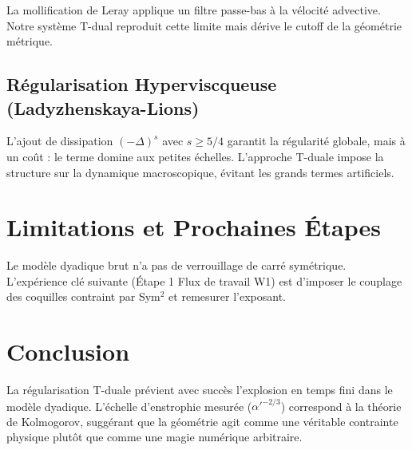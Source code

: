 \documentclass[11pt,a4paper]{article}
\begin{document}
La mollification de Leray applique un filtre passe-bas à la
vélocité advective. Notre système T-dual reproduit cette limite
mais dérive le cutoff de la géométrie métrique.

\subsection{Régularisation Hyperviscqueuse (Ladyzhenskaya-Lions)}

L'ajout de dissipation $(-\Delta)^s$ avec $s \ge 5/4$ garantit la régularité
globale, mais à un coût : le terme domine aux petites échelles. L'approche
T-duale impose la structure sur la dynamique macroscopique, évitant les
grands termes artificiels.

\section{Limitations et Prochaines Étapes}

Le modèle dyadique brut n'a pas de verrouillage de carré symétrique.
L'expérience clé suivante (Étape 1 Flux de travail W1) est d'imposer
le couplage des coquilles contraint par Sym$^2$ et remesurer l'exposant.

\section{Conclusion}

La régularisation T-duale prévient avec succès l'explosion en temps fini dans
le modèle dyadique. L'échelle d'enstrophie mesurée ($\alpha'^{-2/3}$) correspond
à la théorie de Kolmogorov, suggérant que la géométrie agit comme une véritable
contrainte physique plutôt que comme une magie numérique arbitraire.
\end{document}
